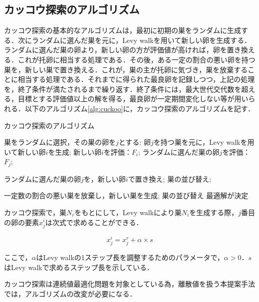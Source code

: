 \documentclass[11pt]{jreport}
\begin{document}
\subsection{カッコウ探索のアルゴリズム}
カッコウ探索の基本的なアルゴリズムは，最初に初期の巣をランダムに生成する．次にランダムに選んだ巣を元に，Levy walkを用いて新しい卵を生成する．ランダムに選んだ巣の卵より，新しい卵の方が評価値が高ければ，卵を置き換える．これが托卵に相当する処理である．その後，ある一定の割合の悪い卵を持つ巣を，新しい巣で置き換える．これが，巣の主が托卵に気づき，巣を放棄することに相当する処理である．それまでに得られた最良卵を記録しつつ，上記の処理を，終了条件が満たされるまで繰り返す．終了条件には，最大世代交代数を超える，目標とする評価値以上の解を得る，最良卵が一定期間変化しない等が用いられる．以下のアルゴリズム\ref{alg:cuckoo}に，カッコウ探索のアルゴリズムを記す．

\begin{algorithm}                 
\caption{カッコウ探索のアルゴリズム}
\label{alg:cuckoo}
\begin{algorithmic}[1]

  
	\State 巣をランダムに選択，その巣の卵を$j$とする:
      \State 卵$j$を持つ巣を元に，Levy walkを用いて新しい卵$i$を生成;
	\State 新しい卵$i$を評価：$F_i$;
	\State ランダムに選んだ巣の卵$j$を評価：$F_j$;
    
		\State ランダムに選んだ巣の卵$j$を，新しい卵$i$で置き換え;
      	         \State 巣の並び替え;
    \EndIf
    
    \State 一定数の割合の悪い巣を放棄し，新しい巣を生成;
    \State 巣の並び替え
\EndWhile
\State 最適解が決定

\end{algorithmic}
\end{algorithm}

\par カッコウ探索で，巣$N_r$をもとにして，Levy walkにより巣$N_i$を生成する際，$j$番目の卵の要素$x_{j}^{i}$は次式で求めることができる．

\begin{equation}
x_{j}^{i}=x_{j}^{r}+\alpha \times s \label{exp:cuckoo}
\end{equation}

ここで，$\alpha$はLevy walkの1ステップ長を調整するためのパラメータで，$\alpha>0$．$s$はLevy walkで求めるステップ長を示している．
\par カッコウ探索は連続値最適化問題を対象としている為，離散値を扱う本提案手法では，アルゴリズムの改変が必要になる．
\end{document}
